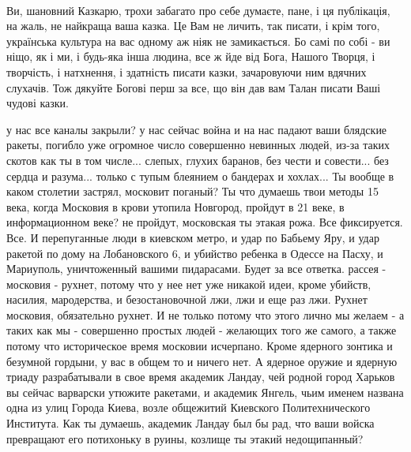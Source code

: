  
 
 
 
 

💙 💛💙 💛💙 💛💙 💛💙 💛💙
💙 💛💙 💛💙 💛💙 💛💙 💛💙
💙 💛💙 💛💙 💛💙 💛💙 💛💙
💙 💛💙 💛💙 💛💙 💛💙 💛💙
💙 💛💙 💛💙 💛💙 💛💙 💛💙
💙 💛💙 💛💙 💛💙 💛💙 💛💙

Ви, шановний Казкарю, трохи забагато про себе думаєте, пане, і ця публікація,
на жаль, не найкраща ваша казка. Це Вам не личить, так писати, і крім того,
українська культура на вас одному аж ніяк не замикається. Бо самі по собі - ви
ніщо, як і ми, і будь-яка інша людина, все ж йде від Бога, Нашого Творця, і
творчість, і натхнення, і здатність писати казки, зачаровуючи ним вдячних
слухачів. Тож дякуйте Богові перш за все, що він дав вам Талан писати Ваші
чудові казки.

у нас все каналы закрыли? у нас сейчас война и на нас падают ваши блядские
ракеты, погибло уже огромное число совершенно невинных людей, из-за таких
скотов как ты в том числе... слепых, глухих баранов, без чести и совести... без
сердца и разума... только с тупым блеянием о бандерах и хохлах... Ты вообще в
каком столетии застрял, московит поганый? Ты что думаешь твои методы 15 века,
когда Московия в крови утопила Новгород, пройдут в 21 веке, в информационном
веке? не пройдут, московская ты этакая рожа. Все фиксируется. Все. И
перепуганные люди в киевском метро, и удар по Бабьему Яру, и удар ракетой по
дому на Лобановского 6, и убийство ребенка в Одессе на Пасху, и Мариуполь,
уничтоженный вашими пидарасами. Будет за все ответка. рассея - московия -
рухнет, потому что у нее нет уже никакой идеи, кроме убийств, насилия,
мародерства, и безостановочной лжи, лжи и еще раз лжи. Рухнет московия,
обязательно рухнет. И не только потому что этого лично мы желаем - а таких как
мы - совершенно простых людей - желающих того же самого, а также потому что
историческое время московии исчерпано. Кроме ядерного зонтика и безумной
гордыни, у вас в общем то и ничего нет. А ядерное оружие и ядерную триаду
разрабатывали в свое время академик Ландау, чей родной город Харьков вы сейчас
варварски утюжите ракетами, и академик Янгель, чьим именем названа одна из улиц
Города Киева, возле общежитий Киевского Политехнического Института. Как ты
думаешь, академик Ландау был бы рад, что ваши войска превращают его потихоньку
в руины, козлище ты этакий недощипанный?

